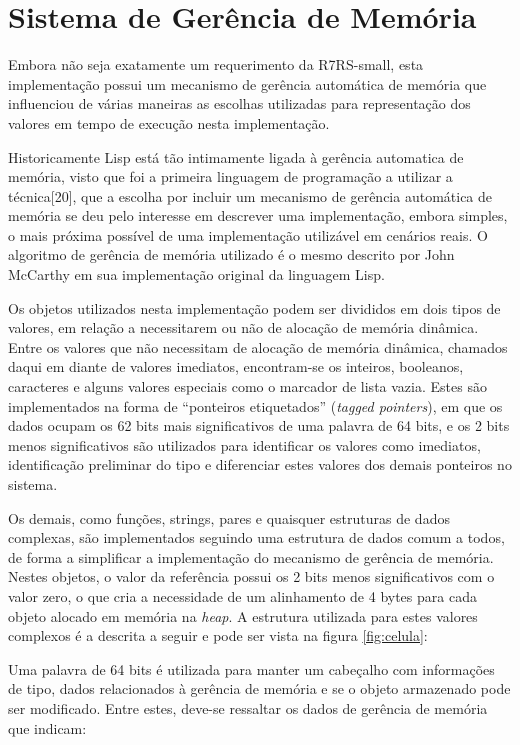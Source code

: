 \section{Sistema de Gerência de Memória}
\label{sec:memoria}

Embora não seja exatamente um requerimento da \acs{R7RS}-small, esta implementação
possui um mecanismo de gerência automática de memória que influenciou de várias
maneiras as escolhas utilizadas para representação dos valores em
tempo de execução nesta implementação.

Historicamente Lisp está tão
intimamente ligada à gerência automatica de memória, visto que foi a primeira
linguagem de programação a utilizar a técnica[20], que a escolha por incluir um
mecanismo de gerência automática de memória se deu pelo interesse em descrever
uma implementação, embora simples, o mais próxima possível de uma implementação
utilizável em cenários reais. O algoritmo de gerência de memória utilizado é 
o mesmo descrito por John McCarthy em sua implementação original da linguagem
Lisp.

Os objetos utilizados nesta implementação podem ser divididos em dois
tipos de valores, em relação a necessitarem ou não de alocação de memória
dinâmica. Entre os valores que não necessitam de alocação de memória dinâmica,
chamados daqui em diante de valores imediatos, encontram-se os inteiros,
booleanos, caracteres e alguns valores especiais como o marcador de lista
vazia. Estes são implementados na forma de ``ponteiros etiquetados''
(\textit{tagged pointers}), em que os dados ocupam os 62 bits mais
significativos de uma palavra de 64 bits, e os 2 bits menos significativos são
utilizados para identificar os valores como imediatos, identificação preliminar
do tipo e diferenciar estes valores dos demais ponteiros no sistema.

Os demais, como funções, strings, pares e quaisquer estruturas de dados
complexas, são implementados seguindo uma estrutura de dados comum a todos, de
forma a simplificar a implementação do mecanismo de gerência de memória.
Nestes objetos, o valor da referência possui os 2 bits menos significativos com
o valor zero, o que cria a necessidade de um alinhamento de 4 bytes para cada
objeto alocado em memória na \textit{heap}. A estrutura utilizada para estes valores complexos é
a descrita a seguir e pode ser vista na figura \ref{fig:celula}:

Uma palavra de 64 bits é utilizada para manter um cabeçalho com informações de
tipo, dados relacionados à gerência de memória e se o objeto armazenado pode
ser modificado. Entre estes, deve-se ressaltar os dados de gerência de memória
que indicam:

